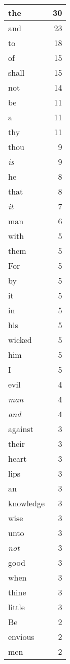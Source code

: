 \begin{center}
\begin{longtable}{l|r}
the & 30\\ \hline 
and & 23\\ \hline 
to & 18\\ \hline 
of & 15\\ \hline 
shall & 15\\ \hline 
not & 14\\ \hline 
be & 11\\ \hline 
a & 11\\ \hline 
thy & 11\\ \hline 
thou & 9\\ \hline 
\emph{is} & 9\\ \hline 
he & 8\\ \hline 
that & 8\\ \hline 
\emph{it} & 7\\ \hline 
man & 6\\ \hline 
with & 5\\ \hline 
them & 5\\ \hline 
For & 5\\ \hline 
by & 5\\ \hline 
it & 5\\ \hline 
in & 5\\ \hline 
his & 5\\ \hline 
wicked & 5\\ \hline 
him & 5\\ \hline 
I & 5\\ \hline 
evil & 4\\ \hline 
\emph{man} & 4\\ \hline 
\emph{and} & 4\\ \hline 
against & 3\\ \hline 
their & 3\\ \hline 
heart & 3\\ \hline 
lips & 3\\ \hline 
an & 3\\ \hline 
knowledge & 3\\ \hline 
wise & 3\\ \hline 
unto & 3\\ \hline 
\emph{not} & 3\\ \hline 
good & 3\\ \hline 
when & 3\\ \hline 
thine & 3\\ \hline 
little & 3\\ \hline 
Be & 2\\ \hline 
envious & 2\\ \hline 
men & 2\\ \hline 

\end{longtable}
\end{center}
